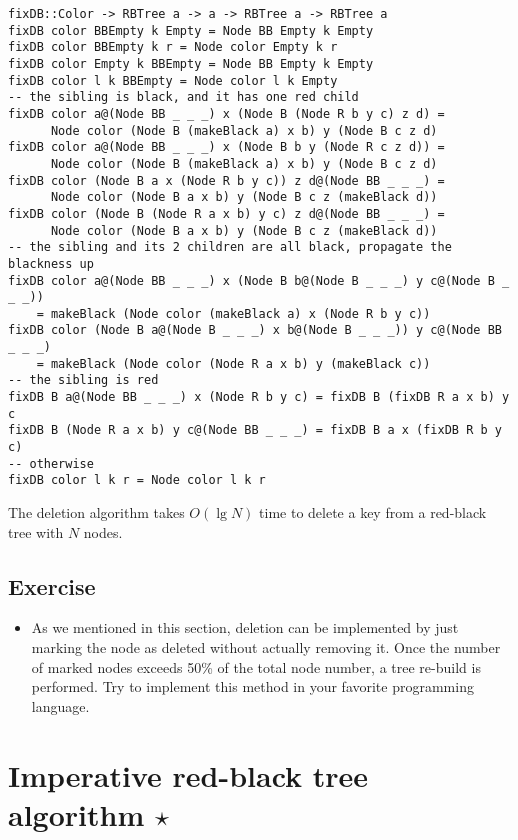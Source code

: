 \documentclass{article}
\begin{document}
\begin{lstlisting}
fixDB::Color -> RBTree a -> a -> RBTree a -> RBTree a
fixDB color BBEmpty k Empty = Node BB Empty k Empty
fixDB color BBEmpty k r = Node color Empty k r
fixDB color Empty k BBEmpty = Node BB Empty k Empty
fixDB color l k BBEmpty = Node color l k Empty
-- the sibling is black, and it has one red child
fixDB color a@(Node BB _ _ _) x (Node B (Node R b y c) z d) = 
      Node color (Node B (makeBlack a) x b) y (Node B c z d)
fixDB color a@(Node BB _ _ _) x (Node B b y (Node R c z d)) = 
      Node color (Node B (makeBlack a) x b) y (Node B c z d)
fixDB color (Node B a x (Node R b y c)) z d@(Node BB _ _ _) = 
      Node color (Node B a x b) y (Node B c z (makeBlack d))
fixDB color (Node B (Node R a x b) y c) z d@(Node BB _ _ _) = 
      Node color (Node B a x b) y (Node B c z (makeBlack d))
-- the sibling and its 2 children are all black, propagate the blackness up
fixDB color a@(Node BB _ _ _) x (Node B b@(Node B _ _ _) y c@(Node B _ _ _))
    = makeBlack (Node color (makeBlack a) x (Node R b y c))
fixDB color (Node B a@(Node B _ _ _) x b@(Node B _ _ _)) y c@(Node BB _ _ _)
    = makeBlack (Node color (Node R a x b) y (makeBlack c))
-- the sibling is red
fixDB B a@(Node BB _ _ _) x (Node R b y c) = fixDB B (fixDB R a x b) y c
fixDB B (Node R a x b) y c@(Node BB _ _ _) = fixDB B a x (fixDB R b y c)
-- otherwise
fixDB color l k r = Node color l k r
\end{lstlisting}

The deletion algorithm takes $O(\lg N)$ time to delete a key from
a red-black tree with $N$ nodes.

\subsection*{Exercise}
\begin{itemize}
\item As we mentioned in this section, deletion can be implemented
by just marking the node as deleted without actually removing it.
Once the number of marked nodes exceeds 50\% of the total node
number, a tree re-build is performed. Try to implement this
method in your favorite programming language.
\end{itemize}

\section{Imperative red-black tree algorithm $\star$}
\end{document}
